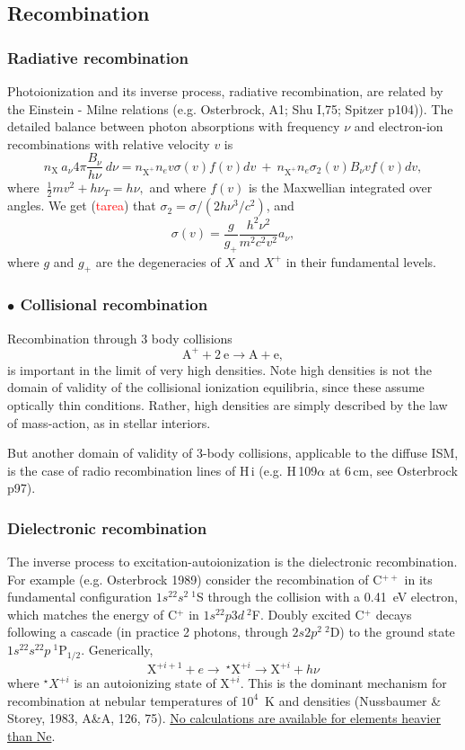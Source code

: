 \subsection{Recombination}
\begin{frame}\frametitle{Radiative recombination} 

Photoionization and its inverse process, radiative recombination, are
related by the Einstein - Milne relations (e.g. Osterbrock, A1; Shu
I,75; Spitzer p104)).  The detailed balance between photon absorptions
with frequency $\nu$ and electron-ion recombinations with relative
velocity $v$ is
\[
n_\mathrm{X} ~a_\nu 4 \pi \frac{B_\nu}{h \nu} ~d\nu = n_{\mathrm{X}^+} n_e
v \sigma(v) f(v) dv~ +~ n_{\mathrm{X}^+} n_e \sigma_2(v)  B_\nu v f(v) dv,
\]
where $~\frac{1}{2} m v^2 + h \nu_T = h \nu,$ and where $f(v)$ is the
Maxwellian integrated over angles. We get (\textcolor{red}{tarea}) that
$\sigma_2 = \sigma / (2 h \nu^3 / c^2 )$, and 
\[
\sigma(v) = \frac{g}{g_{+}}   \frac{h^2  \nu^2 }{m^2 c^2 v^2} a_\nu,    
\] 
where $g$ and $g_+$ are the degeneracies of  $X$
 and  $X^+$ in their fundamental levels.

\end{frame}
\begin{frame}\frametitle{$\bullet$ Collisional recombination} 

Recombination through 3 body collisions 
\[
 \mathrm{A^+} + 2~\mathrm{e}  \rightarrow \mathrm{A} + \mathrm{e}, 
\]
is important in the limit of very high densities. Note high densities
is not the domain of validity of the collisional ionization
equilibria, since these assume optically thin conditions. Rather, high
densities are simply described by the law of mass-action, as in
stellar interiors. 

But another domain of validity of 3-body collisions, applicable to the
diffuse ISM, is the case of radio recombination lines of H\,{\sc i}
(e.g. H\,109$\alpha$ at 6\,cm, see Osterbrock p97).


\end{frame}
\begin{frame}\frametitle{Dielectronic recombination}

The inverse process to excitation-autoionization is the dielectronic
recombination. For example (e.g. Osterbrock 1989) consider the
recombination of C$^{++}$ in its fundamental configuration
$1s^22s^2~^1$S through the collision with a 0.41~eV electron, which
matches the energy of C$^+$ in $1s^22p3d~^2$F. Doubly excited C$^{+}$
decays following a cascade (in practice 2 photons, through
$2s2p^2~^2$D) to the ground state $1s^22s^22p~^1$P$_{1/2}$.
Generically,
\[
\mathrm{X}^{+i+1} + e \rightarrow ~^{\star}\mathrm{X}^{+i} \rightarrow \mathrm{X}^{+i} + h\nu
\]
where $^{\star}X^{+i}$ is an autoionizing state of $\mathrm{X}^{+i}$.
This is the dominant mechanism for recombination at nebular
temperatures of $10^{4}$~K and densities (Nussbaumer \& Storey, 1983,
A\&A, 126, 75). \underline{No calculations are available for elements
heavier than Ne}.


\end{frame}


